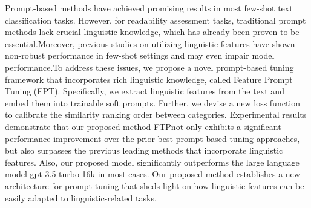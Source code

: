 Prompt-based methods have achieved promising results in most few-shot text classification tasks. However, for readability assessment tasks, traditional prompt methods lack crucial linguistic knowledge, which has already been proven to be essential.Moreover, previous studies on utilizing linguistic features have shown non-robust performance in few-shot settings and may even impair model performance.To address these issues, we propose a novel prompt-based tuning framework that incorporates rich linguistic knowledge, called Feature Prompt Tuning (FPT). Specifically, we extract linguistic features from the text and embed them into trainable soft prompts. Further, we devise a new loss function to calibrate the similarity ranking order between categories. Experimental results demonstrate that our proposed method FTPnot only exhibits a significant performance improvement over the prior best prompt-based tuning approaches, but also surpasses the previous leading methods that incorporate linguistic features.  Also, our proposed model significantly outperforms the large language model gpt-3.5-turbo-16k in most cases. Our proposed method establishes a new architecture for prompt tuning that sheds light on how linguistic features can be easily adapted to linguistic-related tasks.